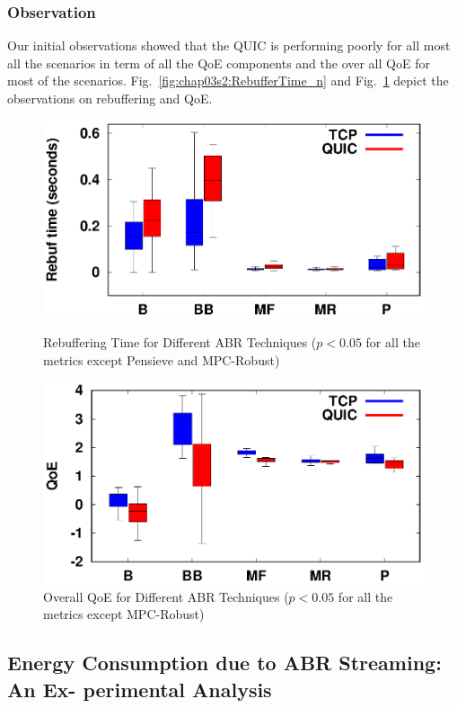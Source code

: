 \subsubsection{Observation}
Our initial observations showed that the QUIC is performing poorly for all most all the scenarios in term of all the QoE components and the over all QoE for most of the scenarios. Fig.~\ref{fig:chap03s2:RebufferTime_n} and Fig.~\ref{fig:chap03s2:QOE_n} depict the observations on rebuffering and QoE.
\begin{figure}[!h]
%	
	\begin{minipage}[t]{0.48\linewidth}
		\includegraphics[width=\linewidth]{img/QUIC/rebuf_box}
		\caption{\label{fig:chap03s2:RebufferTime_n}Rebuffering Time for Different ABR Techniques ($p<0.05$ for all the metrics except Pensieve and MPC-Robust)}
	\end{minipage}\hfill
	\begin{minipage}[t]{0.48\linewidth}
		\includegraphics[width=\linewidth]{img/QUIC/qoe_box}
		\caption{\label{fig:chap03s2:QOE_n}Overall QoE for Different ABR Techniques ($p<0.05$ for all the metrics except MPC-Robust)}
	\end{minipage}
\end{figure}

\subsection{Energy Consumption due to ABR Streaming: An Ex- perimental Analysis}
